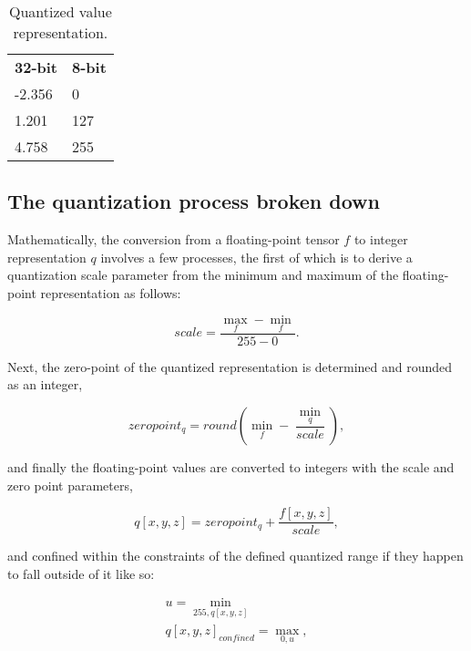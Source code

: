 \begin{table}[]
\centering
\caption[Quantized value representation]{Quantized value representation.}
\label{tbl:quantize}
\begin{tabular}{ll}
\textbf{32-bit} & \textbf{8-bit} \\
-2.356          & 0              \\
1.201           & 127            \\
4.758           & 255           
\end{tabular}
\end{table}

\subsection{The quantization process broken down}
\label{sec:quantization}
Mathematically, the conversion from a floating-point tensor $f$ to integer representation $q$ involves a few processes, the first of which is to derive a quantization scale parameter from the minimum and maximum of the floating-point representation as follows:

\begin{equation}
\label{eqn:scale}
scale = \frac{\max_{f} - \min_{f}}{255 - 0}.
\end{equation}

Next, the zero-point of the quantized representation is determined and rounded as an integer,

\begin{equation}
\label{eqn:zero}
zero point_{q} = round(\min_{f} - \frac{\min_{q}}{scale}),
\end{equation}

and finally the floating-point values are converted to integers with the scale and zero point parameters,

\begin{equation}
\label{eqn:convert}
q[x,y,z] = zero point_{q} + \frac{f[x,y,z]}{scale},
\end{equation}

and confined within the constraints of the defined quantized range if they happen to fall outside of it \cite{gemmlowp} like so:

\begin{equation}
\label{eqn:clamp}
\begin{aligned}
u = \min_{255, q[x,y,z]}
\\
q[x,y,z]_{confined} = \max_{0, u},
\end{aligned}
\end{equation}

